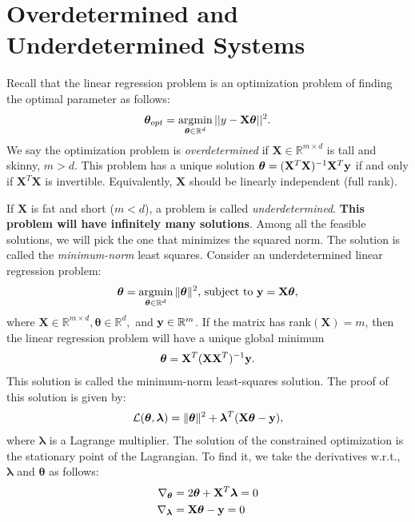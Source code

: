 \section{Overdetermined and Underdetermined Systems}
Recall that the linear regression problem is an optimization problem of finding the optimal parameter as follows:
$$\boldsymbol{\theta}_{opt} = \operatorname*{\operatorname{argmin}}_{\boldsymbol{\theta}\in \mathbb{R}^d}||y-\mathbf{X}\boldsymbol{\theta}||^2.$$
We say the optimization problem is \textit{overdetermined} if $\mathbf{X}\in \mathbb{R}^{m\times d}$ is tall and skinny, \ie $m>d$. This problem has a unique solution $\boldsymbol{\theta}	= (\mathbf{X}^T\mathbf{X})^{-1}\mathbf{X}^T{\mathbf{y}}$ if and only if $\mathbf{X}^T\mathbf{X}$ is invertible. Equivalently, $\mathbf{X}$ should be linearly independent (\ie full rank). 

If $\mathbf{X}$ is fat and short (\ie $m<d$), a problem is called \textit{underdetermined}. \textbf{This problem will have infinitely many solutions}. Among all the feasible solutions, we will pick the one that minimizes the squared norm. The solution is called the \textit{minimum-norm} least squares. Consider an underdetermined linear regression problem:  
\begin{align*}
	\boldsymbol{\theta} = \operatorname*{\operatorname{argmin}}_{\boldsymbol{\theta}\in \mathbb{R}^d} \|\boldsymbol{\theta}\|^2, \,\textrm{subject to}\ {\mathbf{y}} = \mathbf{X}\boldsymbol{\theta},
\end{align*}
where $\mathbf{X}\in \mathbb{R}^{m\times d}, \boldsymbol{\theta}\in \mathbb{R}^d,$ and ${\mathbf{y}}\in \mathbb{R}^m$. If the matrix has rank$(\mathbf{X})=m$, then the linear regression problem will have a unique global minimum 
\begin{align*}
	\boldsymbol{\theta} = \mathbf{X}^T(\mathbf{X}\mathbf{X}^T)^{-1}{\mathbf{y}}.
\end{align*}
This solution is called the minimum-norm least-squares solution. The proof of this solution is given by:
\begin{align*}
	\mathcal{L}(\boldsymbol{\theta}, \boldsymbol{\lambda}) = \|\boldsymbol{\theta}\|^2 + \boldsymbol{\lambda}^T(\mathbf{X}\boldsymbol{\theta}-{\mathbf{y}}),
\end{align*}
where $\boldsymbol{\lambda}$ is a Lagrange multiplier. The solution of the constrained optimization is the stationary point of the Lagrangian. To find it, we take the derivatives w.r.t., $\boldsymbol{\lambda}$ and $\boldsymbol{\theta}$ as follows: 
\begin{align*}
	\nabla_{\boldsymbol{\theta}} &= 2 \boldsymbol{\theta} + \mathbf{X}^T\boldsymbol{\lambda} = 0\\ 
	\nabla_{\boldsymbol{\lambda}} &= \mathbf{X}\boldsymbol{\theta} - {\mathbf{y}} = 0
\end{align*}

